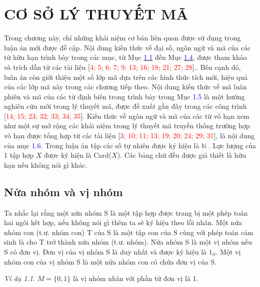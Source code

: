 \setcounter{chapter}{0}
\chapter{CƠ SỞ LÝ THUYẾT MÃ}

Trong chương này, chỉ những khái niệm cơ bản liên quan được sử dụng trong luận án mới được đề cập. Nội dung kiến thức về đại số, ngôn ngữ và mã của các từ hữu hạn trình bày trong các mục,
từ Mục \hyperlink{page.6}{\textcolor{blue}{1.1}} đến Mục \hyperlink{page.16}{\textcolor{blue}{1.4}}, được tham khảo và trích dẫn từ các tài liệu [\textcolor{red}{4; 5; 6; 7; 9; 13; 16; 18; 21; 27; 28}].. Bên cạnh đó, luân án còn giới thiệu một số lớp mã dựa trên các hình thức tích mới, hiệu quả của các lớp mã này trong các chương tiếp theo. Nội dung kiến thức về mã luân phiên và mã của các từ định biên trong trình bày trong Mục \textcolor{blue}{1.5} là một hướng nghiên cứu mới trong lý thuyết mã, được đề xuất gần đây trong các công trình [\textcolor{red}{14; 15; 23; 32; 33; 34; 35}]. Kiến thức về ngôn ngữ và mã của các từ vô hạn xem như một sự mở rộng các khái niệm trong lý thuyết mã truyền thống trường hợp vô hạn được tổng hợp từ các tài liệu [\textcolor{red}{3; 10; 11; 13; 19; 20; 24; 29; 31}], là nội dung của mục \textcolor{blue}{1.6}.
Trong luận án tập các số tự nhiên được ký hiệu là $\mathbb{N}$. Lực lượng của 1 tập hợp $X$ được ký hiện là Card($X$). Các bảng chữ đều được giả thiết là hữu hạn nếu không nói gì khác.
\section{Nửa nhóm và vị nhóm}

Ta nhắc lại rằng một nửa nhóm S là một tập hợp được trang bị một phép toán hai ngôi kết hợp, nếu không nói gì thêm ta sẽ ký hiệu theo lỗi nhân. Một nửa nhóm con (t.ư. nhóm con) T của S là một tập con 
của S cùng với phép toán cảm sinh là cho T trở thành nửa nhóm (t.ư. nhóm). Nửa nhóm S là một vị nhóm nếu S có đơn vị. Đơn vị của vị nhóm S là duy nhất và được ký hiệu là $1_S$.
Một vị nhóm con của vị nhóm S là một nửa nhóm con có chứa đơn vị của S.


\textit{Ví dụ 1.1.} $M = \{0,1\}$ là vị nhóm nhân với phần tử đơn vị là 1.

